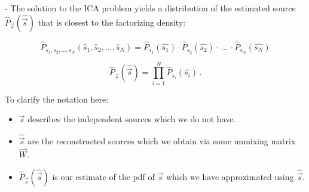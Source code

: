 \begin{frame}


\pause

- The solution to the ICA problem yields a distribution of the estimated source $\widehat{P}_{\vec s}(\widehat{\vec s})$ that is closest to the factorizing density:

\begin{equation}
\widehat{P}_{s_1, s_2,\ldots,s_N}({\widehat s_1, \widehat s_2,\ldots,\widehat s_N}) = \widehat{P}_{s_1}(\widehat{s_1}) \cdot \widehat{P}_{s_2}(\widehat{s_2}) \cdot \, \ldots \, \cdot \widehat{P}_{s_N}(\widehat{s_N})
\end{equation}

\pause

\begin{equation}
\label{eq:facts}
\widehat{P}_{\vec s}(\widehat{\vec s}) = \prod_{i=1}^{N} \widehat{P}_{s_i}(\widehat{s_i})  \,.
\end{equation}

To clarify the notation here:\\
\begin{itemize}
\setlength\itemsep{0.1em}
\item $\vec s$ describes the independent sources which we do not have.
\item $\widehat{\vec s}$ are the reconstructed sources which we obtain via some unmixing matrix $\vec W$.
\item $\widehat{P}_{\vec s}(\widehat{\vec s})$ is our estimate of the pdf of $\vec s$ which we have approximated using $\widehat{\vec s}$. 
\end{itemize}

\end{frame}
